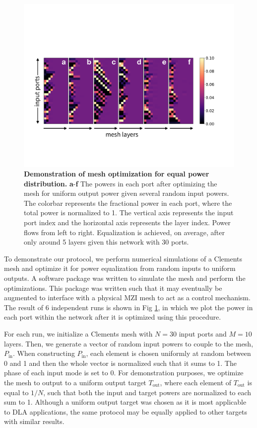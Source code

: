 \begin{figure}[htp]
\centering
\includegraphics[width=1\columnwidth]{figures/MZI_random}
\caption{\label{fig:equalization} \textbf{Demonstration of mesh optimization for equal power distribution.} \textbf{a}-\textbf{f} The powers in each port after optimizing the mesh for uniform output power given several random input powers.  The colorbar represents the fractional power in each port, where the total power is normalized to 1. The vertical axis represents the input port index and the horizontal axis represents the layer index.  Power flows from left to right.  Equalization is achieved, on average, after only around 5 layers given this network with 30 ports.}
\end{figure}

To demonstrate our protocol, we perform numerical simulations of a Clements mesh and optimize it for power equalization from random inputs to uniform outputs. A software package \cite{hughes2018DLA_Control} was written to simulate the mesh and perform the optimizations. This package was written such that it may eventually be augmented to interface with a physical MZI mesh to act as a control mechanism.  The result of 6 independent runs is shown in Fig \ref{fig:equalization}, in which we plot the power in each port within the network after it is optimized using this procedure.

For each run, we initialize a Clements mesh with $N = 30$ input ports and $M = 10$ layers.  Then, we generate a vector of random input powers to couple to the mesh, $P_\textrm{in}$.  When constructing $P_\textrm{in}$, each element is chosen uniformly at random between 0 and 1 and then the whole vector is normalized such that it sums to 1.  The phase of each input mode is set to 0.  For demonstration purposes, we optimize the mesh to output to a uniform output target $T_\textrm{out}$, where each element of $T_\textrm{out}$ is equal to $1/N$, such that both the input and target powers are normalized to each sum to 1.  Although a uniform output target was chosen as it is most applicable to DLA applications, the same protocol may be equally applied to other targets with similar results.

